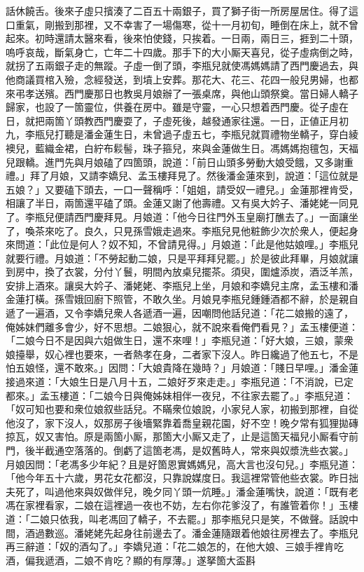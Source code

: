 話休饒舌。後來子虛只擯湊了二百五十兩銀子，買了獅子街一所房屋居住。得了這口重氣，剛搬到那裡，又不幸害了一場傷寒，從十一月初旬，睡倒在床上，就不曾起來。初時還請太醫來看，後來怕使錢，只挨着。一日兩，兩日三，捱到二十頭，嗚呼哀哉，斷氣身亡，亡年二十四歲。{}那手下的大小厮天喜兒，從子虛病倒之時，就拐了五兩銀子走的無蹤。子虛一倒了頭，李瓶兒就使馮媽媽請了西門慶過去，與他商議買棺入殮，念經發送，到墳上安葬。那花大、花三、花四一般兒男婦，也都來弔孝送殯。{}西門慶那日也教吳月娘辦了一張桌席，與他山頭祭奠。當日婦人轎子歸家，也設了一箇靈位，供養在房中。雖是守靈，一心只想着西門慶。從子虛在日，就把兩箇丫頭教西門慶耍了，子虛死後，越發通家往還。一日，正値正月初九，李瓶兒打聽是潘金蓮生日，未曾過子虛五七，李瓶兒就買禮物坐轎子，穿白綾襖兒，藍織金裙，白紵布鬏髻，珠子箍兒，來與金蓮做生日。馮媽媽抱氊包，天福兒跟轎。進門先與月娘磕了四箇頭，說道：「前日山頭多勞動大娘受餓，又多謝重禮。」拜了月娘，又請李嬌兒、孟玉樓拜見了。然後潘金蓮來到，說道：「這位就是五娘？」{}又要磕下頭去，一口一聲稱呼：「姐姐，{}請受奴一禮兒。」金蓮那裡肯受，相讓了半日，兩箇還平磕了頭。金蓮又謝了他壽禮。又有吳大妗子、潘姥姥一同見了。{}李瓶兒便請西門慶拜見。月娘道：「他今日往門外玉皇廟打醮去了。」一面讓坐了，喚茶來吃了。良久，只見孫雪娥走過來。李瓶兒見他粧飾少次於衆人，便起身來問道：「此位是何人？奴不知，不曾請見得。」月娘道：「此是他姑娘哩。」李瓶兒就要行禮。月娘道：「不勞起動二娘，只是平拜拜兒罷。」於是彼此拜畢，月娘就讓到房中，換了衣裳，分付丫鬟，明間內放桌兒擺茶。須臾，圍爐添炭，酒泛羊羔，安排上酒來。讓吳大妗子、潘姥姥、李瓶兒上坐，月娘和李嬌兒主席，孟玉樓和潘金蓮打橫。孫雪娥回廚下照管，不敢久坐。月娘見李瓶兒鍾鍾酒都不辭，於是親自遞了一遍酒，又令李嬌兒衆人各遞酒一遍，因嘲問他話兒道：「花二娘搬的遠了，俺姊妹們離多會少，好不思想。二娘狠心，就不說來看俺們看見？」孟玉樓便道：「二娘今日不是因與六姐做生日，還不來哩！」李瓶兒道：「好大娘，三娘，蒙衆娘擡舉，{}奴心裡也要來，一者熱孝在身，二者家下沒人。昨日纔過了他五七，不是怕五娘怪，還不敢來。」因問：「大娘貴降在幾時？」月娘道：「賤日早哩。」潘金蓮接過來道：「大娘生日是八月十五，二娘好歹來走走。」李瓶兒道：「不消說，已定都來。」孟玉樓道：「二娘今日與俺姊妹相伴一夜兒，不往家去罷了。」李瓶兒道：「奴可知也要和衆位娘叙些話兒。不瞞衆位娘說，小家兒人家，初搬到那裡，自從他沒了，家下沒人，奴那房子後墻緊靠着喬皇親花園，好不空！{}晚夕常有狐狸拋磚掠瓦，奴又害怕。原是兩箇小厮，那箇大小厮又走了，止是這箇天福兒小厮看守前門，後半截通空落落的。倒虧了這箇老馮，是奴舊時人，常來與奴漿洗些衣裳。」月娘因問：「老馮多少年紀？且是好箇恩實媽媽兒，高大言也沒句兒。」李瓶兒道：「他今年五十六歲，男花女花都沒，只靠說媒度日。我這裡常管他些衣裳。昨日拙夫死了，叫過他來與奴做伴兒，晚夕同丫頭一炕睡。」潘金蓮嘴快，說道：「既有老馮在家裡看家，二娘在這裡過一夜也不妨，左右你花爹沒了，有誰管着你！」{}玉樓道：「二娘只依我，叫老馮回了轎子，不去罷。」那李瓶兒只是笑，不做聲。{}話說中間，酒過數巡。潘姥姥先起身往前邊去了。潘金蓮隨跟着他娘往房裡去了。李瓶兒再三辭道：「奴的酒勾了。」李嬌兒道：「花二娘怎的，在他大娘、三娘手裡肯吃酒，偏我遞酒，二娘不肯吃？顯的有厚薄。」遂拏箇大盃斟